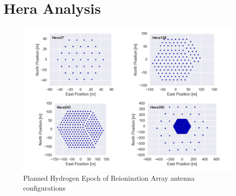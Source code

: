\documentclass[preprint2,numberedappendix,tighten,twocolappendix]{aastex6}  %
\renewcommand\[{\begin{equation}}
\renewcommand\]{\end{equation}}
\begin{document}
\section{\\Hera Analysis}
\begin{widetext}
\begin{figure}[H]
\includegraphics[scale=0.55]{HeraAntpos}

\caption{Planned Hydrogen Epoch of Reionization Array antenna configurations\label{fig:HeraAntpos}}
\end{figure}
\end{widetext}


\end{document}
